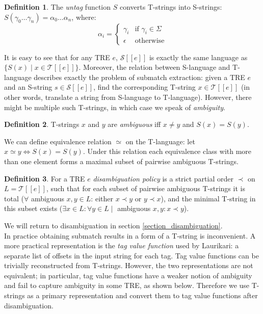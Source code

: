 \documentclass{article}
\newcommand{\Xin}{\!\in\!}
\newcommand{\Xeq}{\!=\!}
\newcommand{\Xlb}{[\![}
\newcommand{\Xrb}{]\!]}
\newcommand{\XS}{\mathcal{S}}
\newcommand{\XT}{\mathcal{T}}
\theoremstyle{definition}
\newtheorem{Xdef}{Definition}
\begin{document}
\begin{multicols}{2}
    \begin{Xdef}\label{untag}
    The \emph{untag} function $S$ converts T-strings into S-strings:
    $S(\gamma_0 \dots \gamma_n) \Xeq \alpha_0 \dots \alpha_n$, where:
    $$\alpha_i = \begin{cases}
            \gamma_i &\text{if } \gamma_i \Xin \Sigma \\[-0.5em]
            \epsilon &\text{otherwise}
        \end{cases}$$
    \end{Xdef}

It is easy to see that for any TRE $e$, $\XS \Xlb e \Xrb$
is exactly the same language as $\{S(x) \mid x \Xin \XT \Xlb e \Xrb\}$.
Moreover, the relation between S-language and T-language
describes exactly the problem of submatch extraction:
given a TRE $e$ and an S-string $s \Xin \XS \Xlb e \Xrb$,
find the corresponding T-string $x \Xin \XT \Xlb e \Xrb$
(in other words, translate a string from S-language to T-language).
However, there might be multiple such T-strings, in which case we speak of \emph{ambiguity}.

    \begin{Xdef}
    T-strings $x$ and $y$ are \emph{ambiguous} iff $x \!\neq\! y$ and $S(x) \Xeq S(y)$.
    \end{Xdef}

We can define equivalence relation $\simeq$ on the T-language: let $x \simeq y \Leftrightarrow S(x) \Xeq S(y)$.
Under this relation each equivalence class with more than one element forms a maximal subset of pairwise ambiguous T-strings.

    \begin{Xdef}
    For a TRE $e$ \emph{disambiguation policy} is a strict partial order $\prec$ on $L \Xeq \XT \Xlb e \Xrb$, such that
    for each subset of pairwise ambiguous T-strings
    it is total ($\forall$ ambiguous $x, y \Xin L$: either $x \prec y$ or $y \prec x$),
    and the minimal T-string in this subset exists ($\exists x \Xin L: \forall y \Xin L \mid$ ambiguous $x, y: x \prec y$).
    \end{Xdef}

We will return to disambiguation in section \ref{section_disambiguation}.
\\

In practice obtaining submatch results in a form of a T-string is inconvenient.
A more practical representation is the \emph{tag value function} used by Laurikari: 
a separate list of offsets in the input string for each tag.
Tag value functions can be trivially reconstructed from T-strings.
However, the two representations are not equivalent;
in particular, tag value functions have a weaker notion of ambiguity and fail to capture ambiguity in some TRE, as shown below.
Therefore we use T-strings as a primary representation
and convert them to tag value functions after disambiguation.


\end{multicols}
\end{document}
